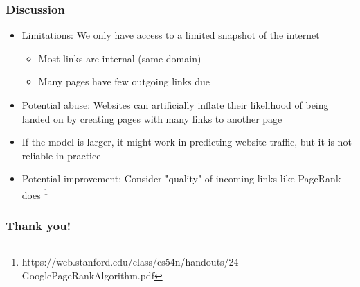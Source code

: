 \documentclass{beamer}
\begin{document}
\begin{frame}
  \frametitle{Discussion}  
  \begin{itemize}
    \item Limitations: We only have access to a limited snapshot of the internet
        \begin{itemize}
          \item Most links are internal (same domain)
          \item Many pages have few outgoing links due
        \end{itemize}
    \item Potential abuse: Websites can artificially inflate their likelihood
      of being landed on by creating pages with many links to another page
    \item If the model is larger, it might work in predicting website traffic, but
      it is not reliable in practice
    \item Potential improvement: Consider "quality" of incoming links  like PageRank
      does \footnote{https://web.stanford.edu/class/cs54n/handouts/24-GooglePageRankAlgorithm.pdf}
  \end{itemize}
\end{frame}

\begin{frame}
  \frametitle{Thank you!}
\end{frame}
\end{document}
